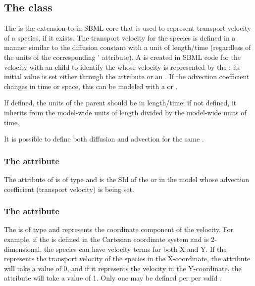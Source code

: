 \subsection{The  class}
\label{AdvectionCoefficient-class}
The \AdvectionCoefficient is the extension to \Parameter in SBML core that is used to represent transport velocity of a species, if it exists. The transport velocity for the species is defined in a manner similar to the diffusion constant with a unit of length/time (regardless of the units of the corresponding \Species'  attribute).  A \Parameter is created in SBML code for the velocity with an \AdvectionCoefficient child to identify the \Species whose velocity is represented by the \Parameter; its initial value is set either through the  attribute or an \InitialAssignment.    If the advection coefficient changes in time or space, this can be modeled with a \Rule or \Event.

If defined, the units of the parent \Parameter should be in length/time; if not defined, it inherits from the model-wide units of length divided by the model-wide units of time.

It is possible to define both diffusion and advection for the same \Species.

\subsubsection{The  attribute}
The  attribute of \AdvectionCoefficient is of type  and is the SId of the \Species or \Parameter in the model whose advection coefficient (transport velocity) is being set.

\subsubsection{The  attribute}
The  is of type  and represents the coordinate component of the velocity. For example, if the \Geometry is defined in the Cartesian coordinate system and is 2-dimensional, the species can have velocity terms for both X and Y. If the \Parameter represents the transport velocity of the species in the X-coordinate, the  attribute will take a value of 0, and if it represents the velocity in the Y-coordinate, the attribute will take a value of 1.  Only one \AdvectionCoefficient may be defined per \Species per valid .

